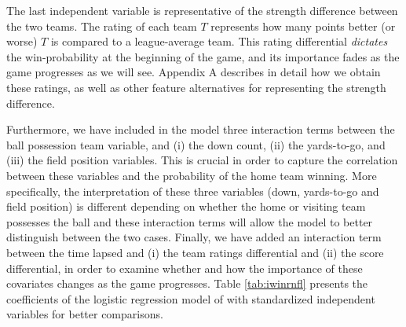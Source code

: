 \documentclass{sig-alternate}
\begin{document}
The last independent variable is representative of the strength difference between the two teams. 
The rating of each team $T$ represents how many points better (or worse) $T$ is compared to a league-average team. 
This rating differential {\em dictates} the win-probability at the beginning of the game, and its importance fades as the game progresses as we will see. 
Appendix A describes in detail how we obtain these ratings, as well as other feature alternatives for representing the strength difference. 
\iffalse
Most of the existing models that include such a variable are using the spread for each game as provided by the betting industry.  
We choose not to do so for the following reason.  
The objective of the betting line is not to predict game outcomes but rather distribute money across the different bets.  
Exactly because of this objective the line is changing during the week before the game.  
While this line can change due to new information for the competing teams (e.g., injury updates), the line is mainly changing when a particular team has accumulated the majority of the bets. 
In this case it will also be hard to choose which line to use (e.g., the opening, the closing or some average of them).  
Therefore, we choose to use the win percentage differential of the two teams as an indicator of their strength (even though this has its own issues given the uneven schedule in NFL).  
However, note that if one would like to use the point spread as a variable this can be easily incorporated in the model. 
\fi
Furthermore, we have included in the model three interaction terms between the ball possession team variable, and (i) the down count, (ii) the yards-to-go, and (iii) the field position variables.
This is crucial in order to capture the correlation between these variables and the probability of the home team winning. 
More specifically, the interpretation of these three variables (down, yards-to-go and field position) is different depending on whether the home or visiting team possesses the ball and these interaction terms will allow the model to better distinguish between the two cases. 
Finally, we have added an interaction term between the time lapsed and (i) the team ratings differential and (ii) the score differential, in order to examine whether and how the importance of these covariates changes as the game progresses. 
Table \ref{tab:iwinrnfl} presents the coefficients of the logistic regression model of {\method} with standardized independent variables for better comparisons. 
\end{document}

